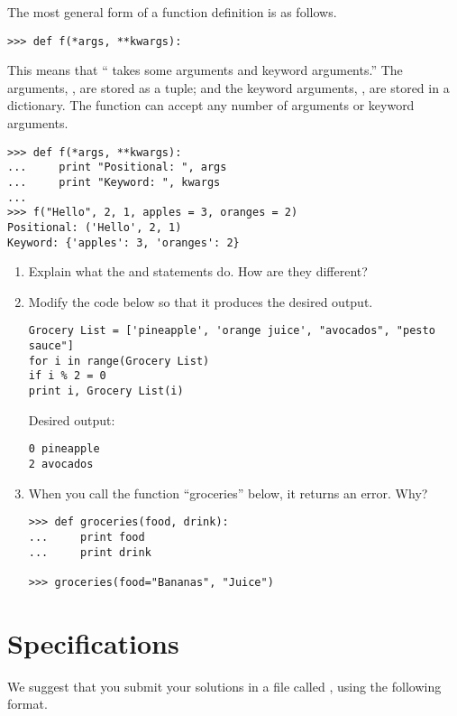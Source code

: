 The most general form of a function definition is as follows.
\begin{lstlisting}
>>> def f(*args, **kwargs):
\end{lstlisting}
This means that `` takes some arguments and keyword arguments.''
The arguments, , are stored as a tuple; and the keyword arguments, , are stored in a dictionary.
The function  can accept any number of arguments or keyword arguments.
\begin{lstlisting}
>>> def f(*args, **kwargs):
...     print "Positional: ", args
...     print "Keyword: ", kwargs
...     
>>> f("Hello", 2, 1, apples = 3, oranges = 2)
Positional: ('Hello', 2, 1)
Keyword: {'apples': 3, 'oranges': 2}
\end{lstlisting}

\begin{problem}

\begin{enumerate}
\item Explain what the  and  statements do. How are they different?
\item Modify the code below so that it produces the desired output.
\begin{lstlisting}
Grocery List = ['pineapple', 'orange juice', "avocados", "pesto sauce"]
for i in range(Grocery List)
if i % 2 = 0
print i, Grocery List(i)
\end{lstlisting}
Desired output:
\begin{lstlisting}
0 pineapple
2 avocados
\end{lstlisting}
\item When you call the function ``groceries'' below, it returns an error. Why?
\begin{lstlisting}
>>> def groceries(food, drink):
...     print food
...     print drink    

>>> groceries(food="Bananas", "Juice")
\end{lstlisting}
\end{enumerate}
\end{problem}



\section*{Specifications}
We suggest that you submit your solutions in a file called , using the following format.

